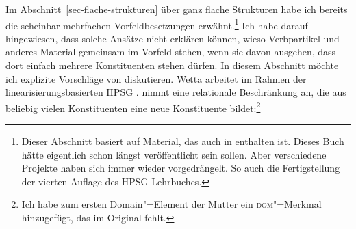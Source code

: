 Im Abschnitt~\ref{sec-flache-strukturen} über ganz flache Strukturen habe ich bereits die scheinbar mehrfachen
Vorfeldbesetzungen erwähnt.\footnote{
Dieser Abschnitt basiert auf Material, das auch in  enthalten ist. Dieses Buch
hätte eigentlich schon längst veröffentlicht sein sollen. Aber verschiedene Projekte haben sich
immer wieder vorgedrängelt. So auch die Fertigstellung der vierten Auflage des HPSG-Lehrbuches.
} Ich habe darauf hingewiesen, dass solche Ansätze nicht erklären können, wieso
Verbpartikel und anderes Material gemeinsam im Vorfeld stehen, wenn sie davon ausgehen, dass dort
einfach mehrere Konstituenten stehen dürfen. In diesem Abschnitt möchte ich explizite Vorschläge von
\citet{Wetta2011a,Wetta2014a-u} diskutieren. Wetta arbeitet im Rahmen der linearisierungsbasierten HPSG
\citep{Reape94a,Kathol95a,Kathol2001a,Mueller99a,Mueller2002b}. \citet{Wetta2011a} nimmt eine
relationale Beschränkung an, die aus beliebig vielen Konstituenten eine neue Konstituente bildet:\footnote{%
  Ich habe zum ersten Domain"=Element der Mutter ein \textsc{dom}"=Merkmal hinzugefügt, das im
  Original fehlt. 
}

